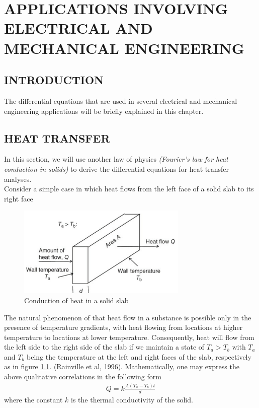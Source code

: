 \documentclass[11pt]{report}
\newcommand{\sps}{\\[0.2cm]}
\begin{document}
	
	\chapter{APPLICATIONS INVOLVING ELECTRICAL AND MECHANICAL ENGINEERING}
	\section{INTRODUCTION}
	The differential equations that are used in several electrical and mechanical engineering applications will be briefly explained in this chapter.
	
	\section{HEAT TRANSFER}
	In this section, we will use another law of physics \textit{(Fourier's law for heat conduction in solids)} to derive the differential equations for heat transfer analyses.\sps
	Consider a simple case in which heat flows from the left face of a solid slab to its right face
	\begin{figure}[h!]
		\centering
		\includegraphics[width=0.68\linewidth]{slab}
		\caption{Conduction of heat in a solid slab}
		\label{fig:4_1}
	\end{figure}
	The natural phenomenon of that heat flow in a substance is possible only in the presence of temperature
	gradients, with heat flowing from locations at higher temperature to locations at lower temperature.
	Consequently, heat will flow from the left side to the right side of the slab if we maintain a state of $T_a > T_b$ with $T_a$ and $T_b$ being the temperature at the left and right faces of the slab, respectively as in figure \ref{fig:4_1}. (Rainville et al, 1996). Mathematically, one may express the above qualitative correlations in the following form
	\begin{eqnarray}
		Q = k \frac{A(T_a - T_b)t}{d}\label{eq:4_10}
	\end{eqnarray}
	where the constant $k$ is the thermal conductivity of the solid.\sps
\end{document}

